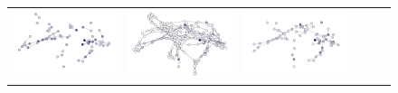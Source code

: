 \begin{figure}[tbhp]
\begin{center}
\begin{tabular}{cccccc}
			{\includegraphics[width=\imgwidth, align=c, trim={0 0 0 0}, clip]{dd/65_640_70nodes_1_1_unsup_pooled.pdf}} &
			{\includegraphics[width=\imgwidth, align=c, trim={0 0 0 0}, clip]{dd/65_640_212nodes_1_1.pdf}} &
			{\includegraphics[width=\imgwidth, align=c, trim={0 0 0 0}, clip]{dd/65_640_73nodes_1_1_pooled.pdf}} \\

\end{tabular}
\end{center}
\end{figure}
